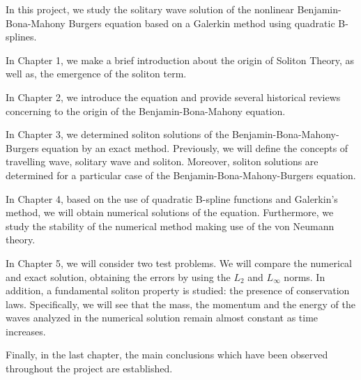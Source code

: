 
\begin{abstracts}

In this project, we study the solitary wave solution of the nonlinear Benjamin-Bona-Mahony Burgers equation based on a Galerkin method using quadratic B-splines.

In Chapter 1, we make a brief introduction about the origin of Soliton Theory, as well as, the emergence of the soliton term.

In Chapter 2, we introduce the equation and provide several historical reviews concerning to the origin of the Benjamin-Bona-Mahony equation.

In Chapter 3, we determined soliton solutions of the Benjamin-Bona-Mahony-Burgers equation by an exact method. Previously, we will define the concepts of travelling wave, solitary wave and soliton. Moreover, soliton solutions are determined for a particular case of the Benjamin-Bona-Mahony-Burgers equation.

In Chapter 4, based on the use of quadratic B-spline functions and Galerkin's method, we will obtain numerical solutions of the equation. Furthermore, we study the stability of the numerical method making use of the von Neumann theory.

In Chapter 5, we will consider two test problems. We will compare the numerical and exact solution, obtaining the errors by using the $L_{2}$ and $L_{\infty}$ norms. In addition, a fundamental soliton property is studied: the presence of conservation laws. Specifically, we will see that the mass, the momentum and the energy of the
waves analyzed in the numerical solution remain almost constant as time increases.

Finally, in the last chapter, the main conclusions which have been observed throughout the project are established.
\end{abstracts}
